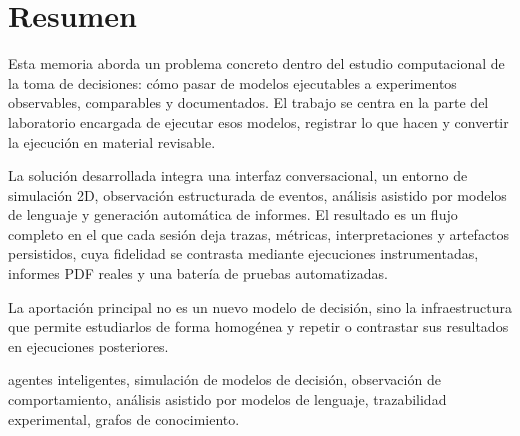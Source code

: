 \pagestyle{plain}
\chapter*{Resumen}

Esta memoria aborda un problema concreto dentro del estudio computacional
de la toma de decisiones: cómo pasar de modelos ejecutables a
experimentos observables, comparables y documentados. El trabajo se
centra en la parte del laboratorio encargada de ejecutar esos modelos,
registrar lo que hacen y convertir la ejecución en material revisable.

La solución desarrollada integra una interfaz conversacional, un entorno
de simulación 2D, observación estructurada de eventos, análisis asistido
por modelos de lenguaje y generación automática de informes. El resultado
es un flujo completo en el que cada sesión deja trazas, métricas,
interpretaciones y artefactos persistidos, cuya fidelidad se contrasta
mediante ejecuciones instrumentadas, informes PDF reales y una batería de
pruebas automatizadas.

La aportación principal no es un nuevo modelo de decisión, sino la
infraestructura que permite estudiarlos de forma homogénea y repetir o
contrastar sus resultados en ejecuciones posteriores.

\vspace{0.5cm}
 agentes inteligentes, simulación de modelos de
decisión, observación de comportamiento, análisis asistido por modelos de
lenguaje, trazabilidad experimental, grafos de conocimiento.
